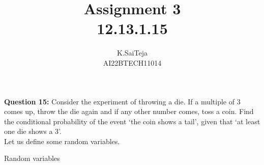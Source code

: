 \documentclass[journal,12pt,twocolumn]{IEEEtran}
\begin{document}
\title{Assignment 3 \\ 12.13.1.15}
\author{K.SaiTeja \\ AI22BTECH11014}	

\maketitle

\textbf{Question 15:}
Consider the experiment of throwing a die. If a multiple of 3 comes up, throw the die again and if any other number comes, toss a coin. Find the conditional probability of the event \lq the coin shows a tail\rq, given that \lq at least one die shows a 3\rq.\\
\solution
Let us define some random variables.
\begin{table}[ht!]
    \centering
	
    \caption{Random variables}
    \label{table:RandomVariables}	
\end{table}
\end{document}
